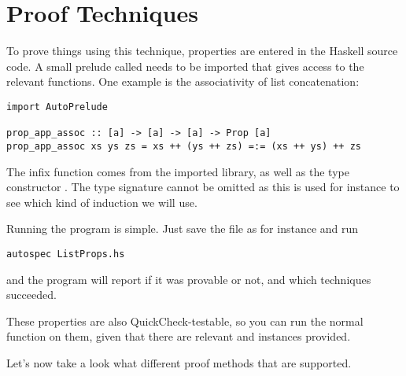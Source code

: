 \chapter{Proof Techniques}


To prove things using this technique, properties are entered in the
Haskell source code. A small prelude called  needs to
be imported that gives access to the relevant functions. One example
is the associativity of list concatenation:

\begin{verbatim}
import AutoPrelude

prop_app_assoc :: [a] -> [a] -> [a] -> Prop [a]
prop_app_assoc xs ys zs = xs ++ (ys ++ zs) =:= (xs ++ ys) ++ zs
\end{verbatim}

The infix function \hs{=:=} comes from the imported library, as well
as the type constructor . The type signature cannot be
omitted as this is used for instance to see which kind of induction we
will use.

Running the program is simple. Just save the file as for instance
 and run

\begin{verbatim}
autospec ListProps.hs
\end{verbatim}

and the program will report if it was provable or not, and which
techniques succeeded.

These properties are also QuickCheck-testable, so you can run the
normal  function on them, given that there are
relevant  and  instances provided.

Let's now take a look what different proof methods that are supported.











